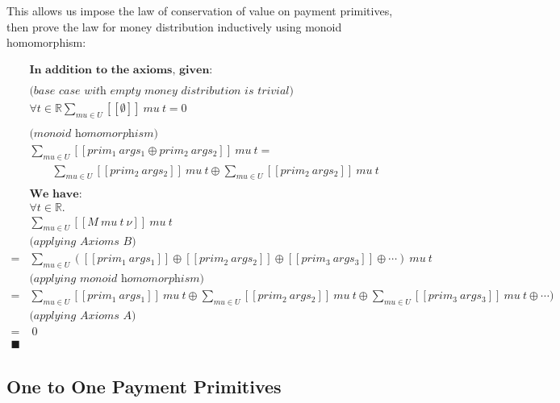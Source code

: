 This allows us impose the law of conservation of value on payment primitives, then prove the law for money
distribution inductively using monoid homomorphism:

\begin{equation}
    \begin{split}
        &\textbf{In addition to the axioms, given:} \\
        \\
        &\textit{(base case with empty money distribution is trivial)} \\
        &\forall t \in \mathbb{R} {\displaystyle \sum_{mu \in U} [\![\emptyset]\!]\ mu\ t = 0} \\
        \\
        &\textit{(monoid homomorphism)} \\
        &{\displaystyle \sum_{mu \in U} [\![prim_1\ args_1\oplus prim_2\ args_2]\!]\ mu\ t} = \\
        &\qquad {\displaystyle \sum_{mu \in U} [\![prim_2\ args_2]\!]\ mu\ t} \oplus
          {\displaystyle \sum_{mu \in U} [\![prim_2\ args_2]\!]\ mu\ t} \\
        \\
        &\textbf{We have:} \\
        &\forall t \in \mathbb{R}. \\
        &{\displaystyle \sum_{mu \in U} [\![M\ mu\ t\ \nu]\!]\ mu\ t} \\
        &\textit{(applying Axioms B)} \\
        = &{\displaystyle \sum_{mu \in U}
            ([\![prim_1\ args_1]\!] \oplus
            [\![prim_2\ args_2]\!] \oplus
            [\![prim_3\ args_3]\!]\oplus \dotsb)
        }\ mu\ t\\
        &\textit{(applying monoid homomorphism)} \\
        = &{\displaystyle \sum_{mu \in U} [\![prim_1\ args_1]\!]\ mu\ t} \oplus
        {\displaystyle \sum_{mu \in U} [\![prim_2\ args_2]\!]\ mu\ t} \oplus
        {\displaystyle \sum_{mu \in U} [\![prim_3\ args_3]\!]\ mu\ t} \oplus \dotsb
        )\\
        &\textit{(applying Axioms A)} \\
        =&\ 0
        \\
        \blacksquare
    \end{split}
\end{equation}

\subsection{One to One Payment Primitives}

